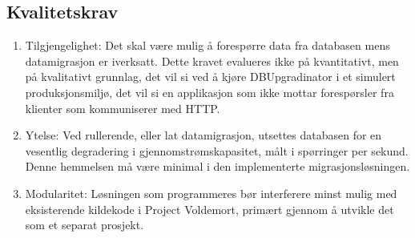 \subsection{Kvalitetskrav}

\begin{enumerate}
  \item Tilgjengelighet: Det skal være mulig å forespørre data fra databasen mens datamigrasjon er iverksatt. Dette kravet evalueres ikke på kvantitativt, men på kvalitativt grunnlag, det vil si ved å kjøre DBUpgradinator i et simulert produksjonsmiljø, det vil si en applikasjon som ikke mottar forespørsler fra klienter som kommuniserer med HTTP.
  \item Ytelse: Ved rullerende, eller lat datamigrasjon, utsettes databasen for en vesentlig degradering i gjennomstrømskapasitet, målt i spørringer per sekund. Denne hemmelsen må være minimal i den implementerte migrasjonsløsningen.
  \item Modularitet: Løsningen som programmeres bør interferere minst mulig med eksisterende kildekode i Project Voldemort, primært gjennom å utvikle det som et separat prosjekt.
\end{enumerate}

